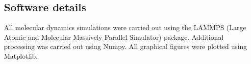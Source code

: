 \subsection{Software details}\label{SoftwareDetails}
All molecular dynamics simulations were carried out using the LAMMPS (Large Atomic and Molecular Massively Parallel Simulator) package.\cite{LAMMPS}
Additional processing was carried out using Numpy.\cite{NumPy}
All graphical figures were plotted using Matplotlib.\cite{MatPlotLib}

